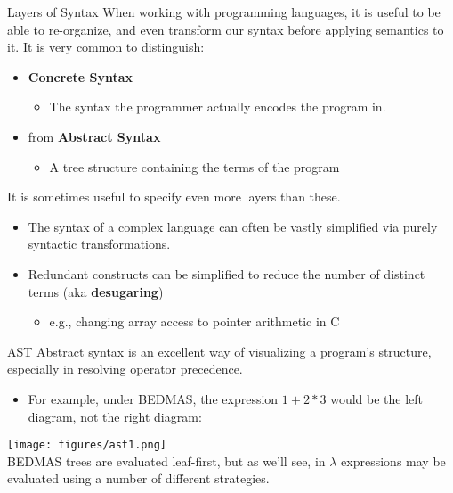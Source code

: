 \documentclass[11pt]{beamer}
\begin{document}
\begin{frame}[fragile=singleslide]{Layers of Syntax}
When working with programming languages, it is useful to be able to re-organize, and even transform our syntax before applying semantics to it.  It is very common to distinguish:
\begin{itemize}
\item \textbf{Concrete Syntax}
\begin{itemize}
\item The syntax the programmer actually encodes the program in.
\end{itemize}
\item from \textbf{Abstract Syntax}
\begin{itemize}
\item A tree structure containing the terms of the program
\end{itemize}
\end{itemize}
It is sometimes useful to specify even more layers than these.  
\begin{itemize}
\item The syntax of a complex language can often be vastly simplified via purely syntactic transformations.
\item Redundant constructs can be simplified to reduce the number of distinct terms (aka \textbf{desugaring})
\begin{itemize}
\item e.g., changing array access to pointer arithmetic in C
\end{itemize}
\end{itemize}
\end{frame}

\begin{frame}[fragile=singleslide]{AST}
Abstract syntax is an excellent way of visualizing a program's structure, especially in resolving operator precedence.  
\begin{itemize}
\item For example, under BEDMAS, the expression $1+2*3$ would be the left diagram, not the right diagram:
\end{itemize}
\begin{center}
\texttt{[image: figures/ast1.png]} \\
BEDMAS trees are evaluated leaf-first, but as we'll see, in $\lambda$ expressions may be evaluated using a number of different strategies.  
\end{center}
\end{frame}
\end{document}
